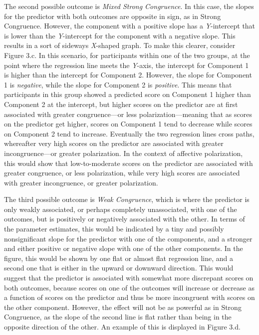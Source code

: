 \documentclass[authordate, meta]{jote-new-article}
\begin{document}
	The second possible outcome is \emph{Mixed Strong Congruence}. In this case, the slopes for the predictor with both outcomes are opposite in sign, as in Strong Congruence. However, the component with a positive slope has a \emph{Y}-intercept that is lower than the \emph{Y}-intercept for the component with a negative slope. This results in a sort of sideways \emph{X}-shaped graph. To make this clearer, consider Figure 3.c. In this scenario, for participants within one of the two groups, at the point where the regression line meets the \emph{Y}-axis, the intercept for Component 1 is higher than the intercept for Component 2. However, the slope for Component 1 is \emph{negative}, while the slope for Component 2 is \emph{positive}. This means that participants in this group showed a predicted score on Component 1 higher than Component 2 at the intercept, but higher scores on the predictor are at first associated with greater congruence—or less polarization—meaning that as scores on the predictor get higher, scores on Component 1 tend to decrease while scores on Component 2 tend to increase. Eventually the two regression lines cross paths, whereafter very high scores on the predictor are associated with greater incongruence—or greater polarization. In the context of affective polarization, this would show that low-to-moderate scores on the predictor are associated with greater congruence, or less polarization, while very high scores are associated with greater incongruence, or greater polarization.



	The third possible outcome is \emph{Weak Congruence}, which is where the predictor is only weakly associated, or perhaps completely unassociated, with one of the outcomes, but is positively or negatively associated with the other. In terms of the parameter estimates, this would be indicated by a tiny and possibly nonsignificant slope for the predictor with one of the components, and a stronger and either positive or negative slope with one of the other components. In the figure, this would be shown by one flat or almost flat regression line, and a second one that is either in the upward or downward direction. This would suggest that the predictor is associated with somewhat more discrepant scores on both outcomes, because scores on one of the outcomes will increase or decrease as a function of scores on the predictor and thus be more incongruent with scores on the other component. However, the effect will not be as powerful as in Strong Congruence, as the slope of the second line is flat rather than being in the opposite direction of the other. An example of this is displayed in Figure 3.d.
\end{document}
